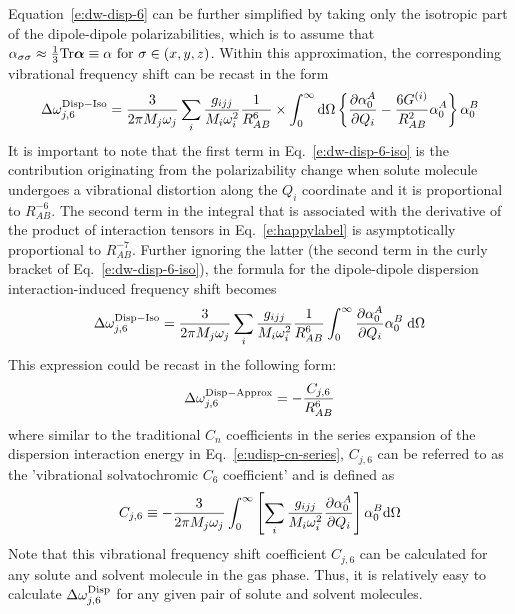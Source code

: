 \documentclass[a4paper,titlepage,twoside,fleqn,12pt]{book}
\newcommand{\BM}[1]{\bm{#1}}
\newcommand{\fderiv}[2]{\ensuremath{
\frac{\partial #1}{\partial #2}}}
\begin{document}
\begin{refsection}
Equation~\eqref{e:dw-disp-6} can be further simplified by taking only the isotropic 
part of the dipole\hyp{}dipole polarizabilities, which is to assume that 
$\alpha_{\sigma\sigma} \approx \frac{1}{3}{\rm Tr}{\BM\alpha} \equiv \alpha \text{ for } \sigma \in (x, y, z)$. 
Within this approximation, the corresponding vibrational frequency shift 
can be recast in the form
%
\begin{equation} \label{e:dw-disp-6-iso}
\Delta \omega_{j,6}^{\rm Disp-Iso} = \frac{3}{2\pi M_j\omega_j}
\sum_i \frac{g_{ijj}}{M_i\omega_i^2} 
\frac{1}{R^6_{AB}} \times
\int_{0}^{\infty} {\rm d}\Omega \left\{ 
\frac{\partial \alpha_0^{A}}{\partial Q_i}- 
\frac{6G^{(i)}}{R^2_{AB}} 
\alpha_0^{A}
\right\}
\alpha_0^{B} 
\end{equation}
%
It is important to note that the first term in Eq.~\eqref{e:dw-disp-6-iso} 
is the contribution originating from the polarizability change 
when solute molecule undergoes a vibrational distortion 
along the $Q_i$ coordinate and it is proportional to $R^{-6}_{AB}$. 
The second term in the integral that is associated with the derivative 
of the product of interaction tensors in Eq.~\eqref{e:happylabel}
is asymptotically proportional to $R^{-7}_{AB}$. Further ignoring the latter 
(the second term in the curly bracket of Eq.~\eqref{e:dw-disp-6-iso}), 
the formula for the dipole\hyp{}dipole dispersion interaction\hyp{}induced 
frequency shift becomes
%
\begin{equation} \label{e:dw-disp-6-iso-approx}
\Delta \omega_{j,6}^{\rm Disp-Iso} = \frac{3}{2\pi M_j\omega_j}
\sum_i \frac{g_{ijj}}{M_i\omega_i^2} 
\frac{1}{R^6_{AB}} 
\int_{0}^{\infty} 
\frac{\partial \alpha_0^{A}}{\partial Q_i}
\alpha_0^{B}  \;{\rm d}\Omega  
\end{equation}
%
This expression could be recast in the following form: 
%
\begin{equation} \label{e:dw-disp-6-iso-approx-cj6}
\Delta \omega_{j,6}^{\rm Disp-Approx} = 
 - \frac{C_{j,6}}{R_{AB}^6}
\end{equation}
%
where similar to the traditional $C_n$ coefficients 
in the series expansion of the dispersion interaction 
energy in Eq.~\eqref{e:udisp-cn-series}, $C_{j,6}$ 
can be referred to as 
the 'vibrational solvatochromic $C_6$ coefficient' 
and is defined as
%
\begin{equation} \label{e:cj6}
C_{j,6} \equiv
-\frac{3}{2\pi M_j\omega_j} 
\int_{0}^{\infty} 
\left[
\sum_i \frac{g_{ijj}}{M_i\omega_i^2} 
\fderiv{\alpha_0^{A}}{Q_i}
\right]
\alpha_0^{B} 
{\rm d}\Omega  
\end{equation}
%
Note that this vibrational frequency shift coefficient 
$C_{j,6}$ can be calculated for any solute and solvent 
molecule in the gas phase. Thus, it is relatively easy 
to calculate $\Delta \omega_{j,6}^{\rm Disp}$ for any 
given pair of solute and solvent molecules.


\end{refsection}
\end{document}

